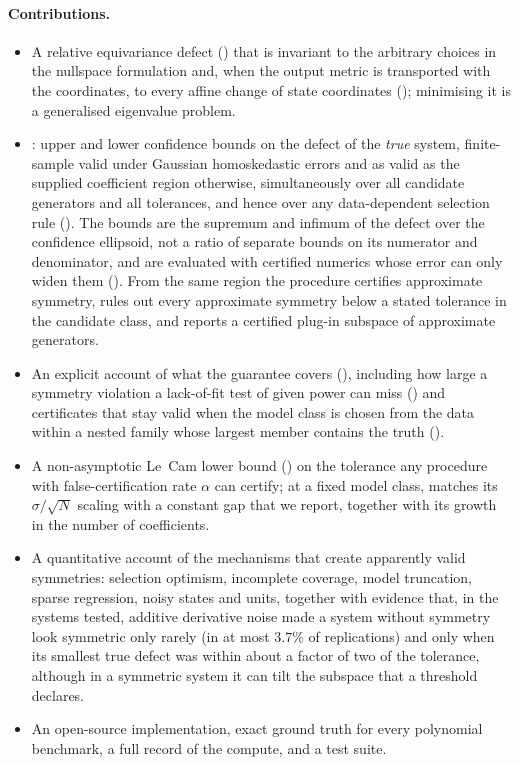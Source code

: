 \paragraph{Contributions.}
\begin{itemize}\itemsep2pt
\item A relative equivariance defect () that is invariant
  to the arbitrary choices in the nullspace formulation and, when the output
  metric is transported with the coordinates, to every affine change of state
  coordinates (); minimising it is a generalised eigenvalue
  problem.
\item \symcert: upper and lower confidence bounds on the defect of the
  \emph{true} system, finite-sample valid under Gaussian homoskedastic errors
  and as valid as the supplied coefficient region otherwise, simultaneously over all candidate
  generators and all tolerances, and hence over any data-dependent selection
  rule (). The bounds are the supremum and infimum of
  the defect over the confidence ellipsoid, not a ratio of separate bounds on
  its numerator and denominator, and are evaluated with certified numerics
  whose error can only widen them (). From the same region the procedure
  certifies approximate symmetry, rules out every approximate symmetry below
  a stated tolerance in the candidate class, and reports a certified plug-in
  subspace of approximate generators.
\item An explicit account of what the guarantee covers (),
  including how large a symmetry violation a lack-of-fit test of given power
  can miss () and certificates that stay valid when the
  model class is chosen from the data within a nested family whose largest
  member contains the truth ().
\item A non-asymptotic Le~Cam lower bound () on the tolerance
  any procedure with false-certification rate $\alpha$ can certify; at a fixed
  model class, \symcert{} matches its $\sigma/\sqrt N$ scaling with a constant
  gap that we report, together with its growth in the number of coefficients.
\item A quantitative account of the mechanisms that create apparently valid
  symmetries: selection optimism, incomplete coverage, model truncation,
  sparse regression, noisy states and units, together with evidence that,
  in the systems tested, additive derivative noise made a system without
  symmetry look symmetric only rarely (in at most $3.7\%$ of replications)
  and only when its smallest true defect was within about a factor of two of
  the tolerance, although in a symmetric system it can tilt the subspace that
  a threshold declares.
\item An open-source implementation, exact ground truth for every polynomial
  benchmark, a full record of the compute, and a test suite.
\end{itemize}
